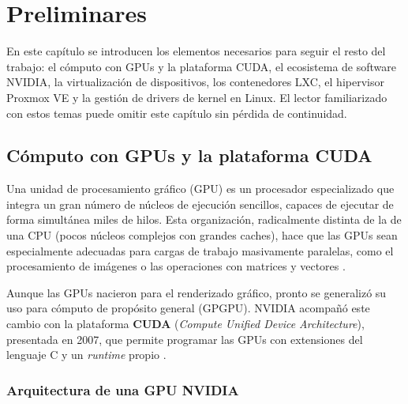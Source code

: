 \chapter*{Preliminares}
\label{Preeliminares}
\renewcommand{\thesection}{\arabic{section}}
\renewcommand{\thesubsection}{\arabic{section}.\arabic{subsection}}
\renewcommand{\thesubsubsection}{\arabic{section}.\arabic{subsection}.\arabic{subsubsection}}
\renewcommand{\thetable}{\arabic{table}}
\renewcommand{\thefigure}{\arabic{figure}}
\renewcommand{\theequation}{\arabic{equation}}
\setcounter{section}{0}
\setcounter{table}{0}
\setcounter{figure}{0}
\setcounter{equation}{0}

En este capítulo se introducen los elementos necesarios para seguir el resto del trabajo: el cómputo con GPUs y la plataforma CUDA, el ecosistema de software NVIDIA, la virtualización de dispositivos, los contenedores LXC, el hipervisor Proxmox VE y la gestión de drivers de kernel en Linux. El lector familiarizado con estos temas puede omitir este capítulo sin pérdida de continuidad.

\section{Cómputo con GPUs y la plataforma CUDA}

Una unidad de procesamiento gráfico (GPU) es un procesador especializado que integra un gran número de núcleos de ejecución sencillos, capaces de ejecutar de forma simultánea miles de hilos. Esta organización, radicalmente distinta de la de una CPU (pocos núcleos complejos con grandes caches), hace que las GPUs sean especialmente adecuadas para cargas de trabajo masivamente paralelas, como el procesamiento de imágenes o las operaciones con matrices y vectores \cite{nvidia_cuda_programming}.

Aunque las GPUs nacieron para el renderizado gráfico, pronto se generalizó su uso para cómputo 
de propósito general (GPGPU). NVIDIA acompañó este cambio con la plataforma \textbf{CUDA} (\textit{Compute Unified Device Architecture}),
 presentada en 2007, que permite programar las GPUs con extensiones del lenguaje C y un \textit{runtime} propio 
 \cite{nvidia_cuda_programming}. 
\subsection{Arquitectura de una GPU NVIDIA}

